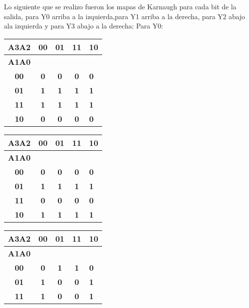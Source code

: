 Lo siguiente que se realizo fueron los mapas de Karnaugh para cada bit de la salida, para Y0 arriba a la izquierda,para Y1 arriba a la derecha, para Y2 abajo ala izquierda y para Y3 abajo a la derecha:
Para Y0:
\begin{table}[htb] 
\centering
\begin{tabular}{|c|c|c|c|l|}
\hline
\textbf{A3A2} & \textbf{00} & \textbf{01} & \textbf{11} & \textbf{10} \\ \hline
\textbf{A1A0} & \multicolumn{4}{c|}{\textbf{}}                        \\ \hline
\textbf{00}   & \textbf{0}  & \textbf{0}  & \textbf{0}  & \textbf{0}  \\ \hline
\textbf{01}   & \textbf{1}  & \textbf{1}  & \textbf{1}  & \textbf{1}  \\ \hline
\textbf{11}   & \textbf{1}  & \textbf{1}  & \textbf{1}  & \textbf{1}  \\ \hline
\textbf{10}   & \textbf{0}  & \textbf{0}  & \textbf{0}  & \textbf{0}  \\ \hline
\end{tabular}
\begin{tabular}{|c|c|c|c|l|}
\hline
\textbf{A3A2} & \textbf{00} & \textbf{01} & \textbf{11} & \textbf{10} \\ \hline
\textbf{A1A0} & \multicolumn{4}{c|}{\textbf{}}                        \\ \hline
\textbf{00}   & \textbf{0}  & \textbf{0}  & \textbf{0}  & \textbf{0}  \\ \hline
\textbf{01}   & \textbf{1}  & \textbf{1}  & \textbf{1}  & \textbf{1}  \\ \hline
\textbf{11}   & \textbf{0}  & \textbf{0}  & \textbf{0}  & \textbf{0}  \\ \hline
\textbf{10}   & \textbf{1}  & \textbf{1}  & \textbf{1}  & \textbf{1}  \\ \hline
\end{tabular}
\begin{tabular}{|c|c|c|c|l|}
\hline
\textbf{A3A2} & \textbf{00} & \textbf{01} & \textbf{11} & \textbf{10} \\ \hline
\textbf{A1A0} & \multicolumn{4}{c|}{\textbf{}}                        \\ \hline
\textbf{00}   & \textbf{0}  & \textbf{1}  & \textbf{1}  & \textbf{0}  \\ \hline
\textbf{01}   & \textbf{1}  & \textbf{0}  & \textbf{0}  & \textbf{1}  \\ \hline
\textbf{11}   & \textbf{1}  & \textbf{0}  & \textbf{0}  & \textbf{1}  \\ \hline

\end{tabular}
\end{table}
